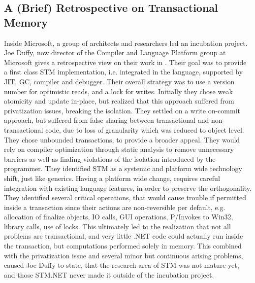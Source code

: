 \subsection{A (Brief) Retrospective on Transactional Memory}
Inside Microsoft, a group of architects and researchers led an incubation project. Joe Duffy, now director of the Compiler and Language Platform group at Microsoft gives a retrospective view on their work in \cite{duffy2010stmnet}. Their goal was to provide a first class \ac{STM} implementation, i.e. integrated in the language, supported by \ac{JIT}, \ac{GC}, compiler and debugger. Their overall strategy was to use a version number for optimistic reads, and a lock for writes. Initially they chose weak atomicity and update in-place, but realized that this approach suffered from privatization issues, breaking the isolation. They settled on a write on-commit approach, but suffered from false sharing between transactional and non-transactional code, due to loss of granularity which was reduced to object level. They chose unbounded transactions, to provide a broader appeal. They would rely on compiler optimization through static analysis to remove unnecessary barriers as well as finding violations of the isolation introduced by the programmer. They identified \ac{STM} as a systemic and platform wide technology shift, just like generics. Having a platform wide change, requires careful integration with existing language features, in order to preserve the orthogonality. They identified several critical operations, that would cause trouble if permitted inside a transaction since their actions are non-reversible per default, e.g. allocation of finalize objects, \ac{IO} calls, GUI operations, P/Invokes to Win32, library calls, use of locks. This ultimately led to the realization that not all problems are transactional, and very little .NET code could actually run inside the transaction, but computations performed solely in memory. This combined with the privatization issue and several minor but continuous arising problems, caused Joe Duffy to state, that the research area of \ac{STM} was not mature yet, and those STM.NET never made it outside of the incubation project.


